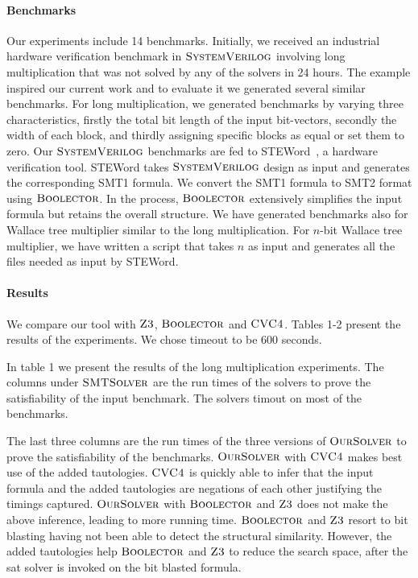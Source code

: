 \paragraph{\bf Benchmarks}
%
Our experiments include 14 benchmarks.
%
Initially, we received an industrial hardware verification benchmark in $\textsc{SystemVerilog}$ involving long multiplication that was not solved by any of the solvers in 24 hours.
%
The example inspired our current work and to evaluate it we generated several similar benchmarks.
%
For long multiplication, we generated benchmarks by varying three characteristics, firstly the total bit length of the input bit-vectors, secondly the width of each block, and thirdly assigning specific blocks as equal or set them to zero.
%
Our $\textsc{SystemVerilog}$ benchmarks are fed to STEWord~\cite{Word-level-Symbolic-Trajectory-Evaluation}, a hardware verification tool.
%
STEWord takes $\textsc{SystemVerilog}$ design as input and generates the corresponding SMT1 formula.
%
We convert the SMT1 formula to SMT2 format using $\textsc{Boolector}$.
%
In the process, $\textsc{Boolector}$ extensively simplifies the input formula but retains the overall structure.
%
We have generated benchmarks also for Wallace tree multiplier similar to the long multiplication.
%
For $n$-bit Wallace tree multiplier, we have written a script that takes $n$ as input and generates all the files needed as input by STEWord.
%

\paragraph{\bf Results}
%
We compare our tool with $\textsc{Z3}$, $\textsc{Boolector}$ and $\textsc{CVC4}$. Tables 1-2 present the results of the experiments. We chose timeout to be 600 seconds.
%


In table 1 we present the results of the long multiplication experiments. The columns under $\textsc{SMTSolver}$ are the run times of the solvers to prove the satisfiability of the input benchmark. The solvers timout on most of the benchmarks. 

The last three columns are the run times of the three versions of $\textsc{OurSolver}$ to prove the satisfiability of the benchmarks.
%
$\textsc{OurSolver}$ with $\textsc{CVC4}$ makes best use of the added tautologies. $\textsc{CVC4}$ is quickly able to infer that the input formula and the added tautologies are negations of each other justifying the timings captured. 
$\textsc{OurSolver}$ with $\textsc{Boolector}$ and $\textsc{Z3}$ does not make the above inference, leading to more running time. $\textsc{Boolector}$ and $\textsc{Z3}$ resort to bit blasting having not been able to detect the structural similarity. However, the added tautologies help $\textsc{Boolector}$ and $\textsc{Z3}$ to reduce the search space, after the sat solver is invoked on the bit blasted formula.


